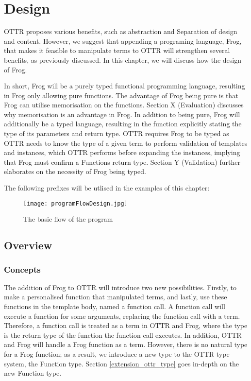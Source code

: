 
\chapter{Design} %
OTTR proposes various benefits, such as abstraction and Separation of design and content. However, we suggest that appending a programing language, Frog, that makes it feasible to manipulate terms to OTTR will strengthen several benefits, as previously discussed.  In this chapter, we will discuss how the design of Frog.

\para 
In short, Frog will be a purely typed functional programming language, resulting in Frog only allowing pure functions. The advantage of Frog being pure is that Frog can utilise memorisation on the functions. Section X (Evaluation) discusses why memorisation is an advantage in Frog. In addition to being pure, Frog will additionally be a typed language, resulting in the function explicitly stating the type of its parameters and return type. OTTR requires Frog to be typed as OTTR needs to know the type of a given term to perform validation of templates and instances, which OTTR performs before expanding the instances, implying that Frog must confirm a Functions return type. Section Y (Validation) further elaborates on the necessity of Frog being typed. 

\para
The following prefixes will be utlised in the examples of this chapter:



\begin{figure}[h]
    \centering
    \texttt{[image: programFlowDesign.jpg]}
    \caption{The basic flow of the program}
    \label{fig:basic_program_flow}
\end{figure}

\section{Overview}

\subsection{Concepts}
\label{concepts}
The addition of Frog to OTTR will introduce two new possibilities. Firstly, to make a personalised function that manipulated terms, and lastly, use these functions in the template body, named a function call. A function call will execute a function for some arguments, replacing the function call with a term. Therefore, a function call is treated as a term in OTTR and Frog, where the type is the return type of the function the function call executes. In addition, OTTR and Frog will handle a Frog function as a term. However, there is no natural type for a Frog function; as a result, we introduce a new type to the OTTR type system, the Function type. Section \ref{extension_ottr_type} goes in-depth on the new Function type. 

